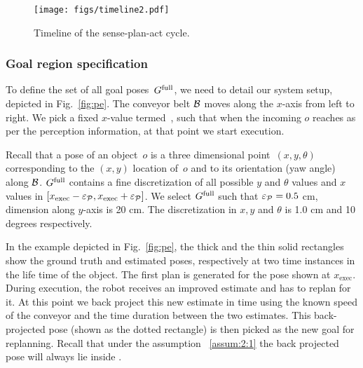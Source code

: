 \documentclass[a4paper]{report}
\begin{document}
\begin{figure}[t]
    \centering
    \texttt{[image: figs/timeline2.pdf]}
    \caption{\CaptionTextSize Timeline of the sense-plan-act cycle.}
    \label{fig:tl}
\end{figure}

\subsubsection{Goal region specification}
To define the set of all goal poses~$G^{\textrm{full}}$, we need to detail our system setup, depicted in Fig.~\ref{fig:pe}.
The conveyor belt $\mathcal{B}$ moves along the $x$-axis from left to right.
We pick a fixed $x$-value termed~\Xexec, such that when the incoming $o$ reaches \Xexec as per the perception information, at that point we start execution.

%
Recall that a pose of an object~$o$ is a three dimensional point~$(x,y,\theta)$ corresponding to the $(x,y)$ location of~$o$ and to its orientation (yaw angle) along $\mathcal{B}$.
%
$G^{\textrm{full}}$ contains a fine discretization of all possible $y$ and $\theta$ values and $x$ values in  $[x_{\textrm{exec}}-\varepsilon_\mathcal{P}, x_{\textrm{exec}}+\varepsilon_\mathcal{P}]$.
We select $G^{\textrm{full}}$ such that $\varepsilon_\mathcal{P} = 0.5$ cm, dimension along $y$-axis is 20 cm. The discretization in $x,y$ and $\theta$ is 1.0 cm and 10 degrees respectively.

In the example depicted in Fig.~\ref{fig:pe}, the thick and the thin solid rectangles show the ground truth and estimated poses, respectively at two time instances in the life time of the object.
%
The first plan is generated for the pose shown at $x_{\textrm{exec}}$. During execution, the robot receives an improved estimate and has to replan for it. At this point we back project this new estimate in time using the known speed of the conveyor and the time duration between the two estimates. This back-projected pose (shown as the dotted rectangle) is then picked as the new goal for replanning. Recall that under the assumption ~\ref{assum:2:1} the back projected pose will always lie inside \Gfull.
%
\end{document}
